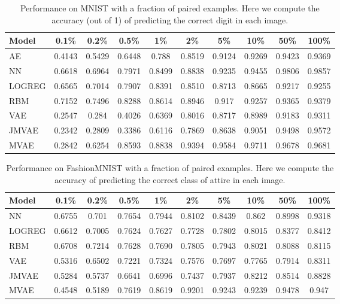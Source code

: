 \begin{table}
\centering
\scriptsize
\begin{tabular}{ l|c|c|c|c|c|c|c|c|c }
    \toprule
    Model & 0.1\% & 0.2\% & 0.5\% & 1\% & 2\% & 5\% & 10\% & 50\% & 100\% \\
    \hline
    AE & 0.4143 & 0.5429 & 0.6448 & 0.788 & 0.8519 & 0.9124 & 0.9269 & 0.9423 & 0.9369 \\
    NN & 0.6618 & 0.6964 & 0.7971 & 0.8499 & 0.8838 & 0.9235 & 0.9455 & 0.9806 & 0.9857 \\
    LOGREG & 0.6565 & 0.7014 & 0.7907 & 0.8391 & 0.8510 & 0.8713 & 0.8665 & 0.9217 & 0.9255 \\
    RBM & 0.7152 & 0.7496 & 0.8288 & 0.8614 & 0.8946 & 0.917 & 0.9257 & 0.9365 & 0.9379 \\
    VAE & 0.2547 & 0.284 & 0.4026 & 0.6369 & 0.8016 & 0.8717 & 0.8989 & 0.9183 & 0.9311 \\
    JMVAE & 0.2342 & 0.2809 & 0.3386 & 0.6116 & 0.7869 & 0.8638 & 0.9051 & 0.9498 & 0.9572 \\
    MVAE & 0.2842 & 0.6254 & 0.8593 &0.8838 & 0.9394 & 0.9584 & 0.9711 & 0.9678 & 0.9681 \\
    \bottomrule
\end{tabular}
\caption{Performance on MNIST with a fraction of paired examples. Here we compute the accuracy (out of 1) of predicting the correct digit in each image.}
\label{table:x_results}
\end{table}

\begin{table}
\centering
\scriptsize
\begin{tabular}{ l|c|c|c|c|c|c|c|c|c }
    \toprule
    Model & 0.1\% & 0.2\% & 0.5\% & 1\% & 2\% & 5\% & 10\% & 50\% & 100\% \\
    \hline
    NN & 0.6755 & 0.701 & 0.7654 & 0.7944 & 0.8102 & 0.8439 & 0.862 & 0.8998 & 0.9318 \\
    LOGREG & 0.6612 & 0.7005 & 0.7624 & 0.7627 & 0.7728 & 0.7802 & 0.8015 & 0.8377 & 0.8412 \\
    RBM & 0.6708 & 0.7214 & 0.7628 & 0.7690 & 0.7805 & 0.7943 & 0.8021 & 0.8088 & 0.8115 \\
    VAE & 0.5316 & 0.6502 & 0.7221 & 0.7324 & 0.7576 & 0.7697 & 0.7765 & 0.7914 & 0.8311 \\
    JMVAE & 0.5284 & 0.5737 & 0.6641 & 0.6996 & 0.7437 & 0.7937 & 0.8212 & 0.8514 & 0.8828 \\
    MVAE & 0.4548 & 0.5189 & 0.7619 & 0.8619 & 0.9201 & 0.9243 & 0.9239 & 0.9478 & 0.947 \\
    \bottomrule
\end{tabular}
\caption{Performance on FashionMNIST with a fraction of paired examples. Here we compute the accuracy of predicting the correct class of attire in each image.}
\label{table:x_results}
\end{table}

